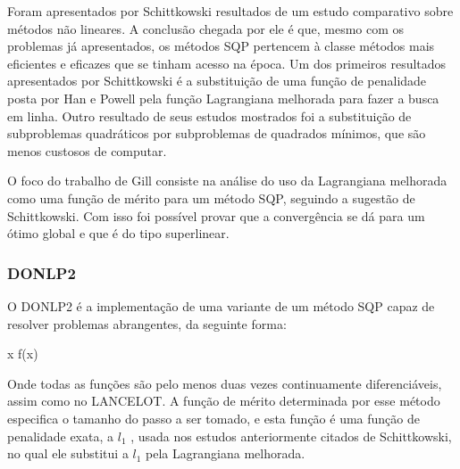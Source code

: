 Foram apresentados por Schittkowski \cite{schittkowski1982nonlinear} resultados de um estudo
comparativo sobre métodos não lineares. A conclusão chegada por ele é que, mesmo com os problemas
já apresentados, os métodos SQP pertencem à classe métodos mais eficientes e eficazes que se tinham
acesso na época. Um dos primeiros resultados apresentados por Schittkowski é a substituição de uma
função de penalidade posta por Han e Powell pela função Lagrangiana melhorada para fazer a busca em linha.
Outro resultado de seus estudos mostrados foi a substituição de subproblemas quadráticos por
subproblemas de quadrados mínimos, que são menos custosos de computar.

O foco do trabalho de Gill \cite{gill1986some} consiste na análise do uso da Lagrangiana melhorada
como uma função de mérito para um método SQP, seguindo a sugestão de Schittkowski. Com isso foi
possível provar que a convergência se dá para um ótimo global e que é do tipo superlinear.



\subsubsection{DONLP2}
\label{sec_dosnlp2}

\noindent
O DONLP2 é a implementação de uma variante de um método SQP capaz de resolver problemas 
abrangentes, da seguinte forma:

\vspace{-15pt}
\begin{mini!}
{x}{ f(x) \label{donl2_obj}}{\label{prob_donlp2}}{}
\end{mini!}

Onde todas as funções são pelo menos duas vezes continuamente diferenciáveis, assim como no
LANCELOT. A função de mérito determinada por esse método especifica o tamanho do passo a ser tomado,
e esta função é uma função de penalidade exata, a \( l_1 \) \cite{han1979exact}, usada nos estudos
anteriormente citados de Schittkowski, no qual ele substitui a \(l_1\) pela Lagrangiana melhorada.